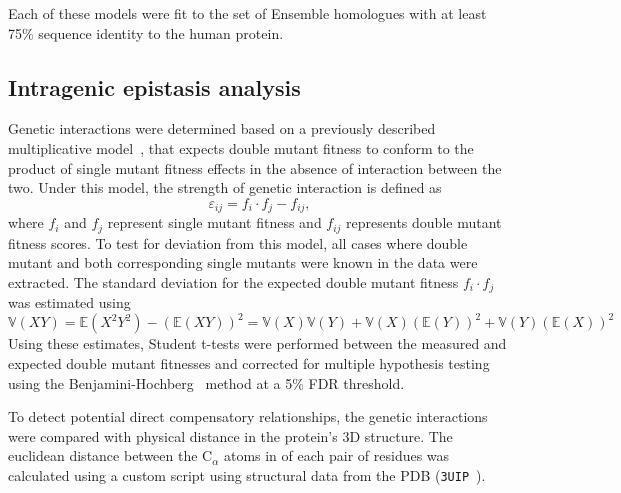 Each of these models were fit to the set of Ensemble homologues with at least 75\% sequence identity to the human protein. 

\subsection{Intragenic epistasis analysis} Genetic interactions were determined based on a previously described multiplicative model~\cite{phillips_language_1998,onge_systematic_2007}, that expects double mutant fitness to conform to the product of single mutant fitness effects in the absence of interaction between the two. Under this model, the strength of genetic interaction is defined as $$\varepsilon_{ij} = f_i \cdot f_j - f_{ij},$$ where $f_i$ and $f_j$ represent single mutant fitness and $f_{ij}$ represents double mutant fitness scores. To test for deviation from this model, all cases where double mutant and both corresponding single mutants were known in the data were extracted. The standard deviation for the expected double mutant fitness $f_i \cdot f_j$ was estimated using
$$ \mathbb{V}(XY) = \mathbb{E}(X^2Y^2)-(\mathbb{E}(XY))^2=\mathbb{V}(X)\mathbb{V}(Y) + \mathbb{V}(X)(\mathbb{E}(Y))^2+\mathbb{V}(Y)(\mathbb{E}(X))^2 $$ 
Using these estimates, Student t-tests were performed between the measured and expected double mutant fitnesses and corrected for multiple hypothesis testing using the  Benjamini-Hochberg~\cite{benjamini_controlling_1995} method at a 5\% FDR threshold.

To detect potential direct compensatory relationships, the genetic interactions were compared with physical distance in the protein's 3D structure. The euclidean distance between the C$_\alpha$ atoms in of each pair of residues was calculated using a custom script using structural data from the PDB (\texttt{3UIP}~\cite{gareau_determinants_2012}).



